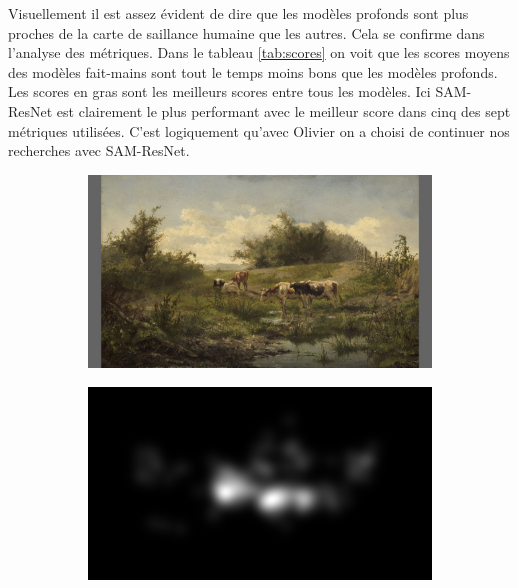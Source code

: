 \par
Visuellement il est assez évident de dire que les modèles profonds sont plus proches de la carte de saillance humaine que les autres. Cela se confirme dans l'analyse des métriques. Dans le tableau \ref{tab:scores} on voit que les scores moyens des modèles fait-mains sont tout le temps moins bons que les modèles profonds. Les scores en gras sont les meilleurs scores entre tous les modèles. Ici SAM-ResNet est clairement le plus performant avec le meilleur score dans cinq des sept métriques utilisées. C'est logiquement qu'avec Olivier on a choisi de continuer nos recherches avec SAM-ResNet.

\vfill

\begin{figure}[ht]
    \centering
    \begin{subfigure}{0.24\textwidth}
        \includegraphics[width=\linewidth]{datas/predictions/stimulus_cows_at_a_pond_Bilders_1856.jpg}
        \caption{}
    \end{subfigure}
    \begin{subfigure}{0.24\textwidth}
        \includegraphics[width=\linewidth]{datas/predictions/human_cows_at_a_pond_Bilders_1856.jpg}
        \caption{}
    \end{subfigure}


\end{figure}
